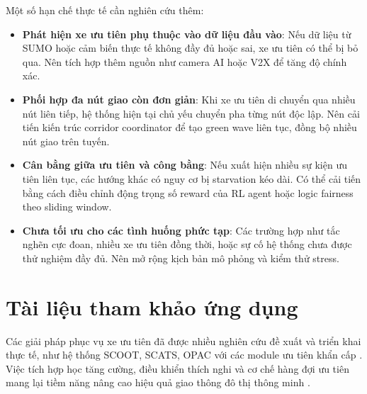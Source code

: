 Một số hạn chế thực tế cần nghiên cứu thêm:
\begin{itemize}
    \item \textbf{Phát hiện xe ưu tiên phụ thuộc vào dữ liệu đầu vào}: Nếu dữ liệu từ SUMO hoặc cảm biến thực tế không đầy đủ hoặc sai, xe ưu tiên có thể bị bỏ qua. Nên tích hợp thêm nguồn như camera AI hoặc V2X để tăng độ chính xác.
    \item \textbf{Phối hợp đa nút giao còn đơn giản}: Khi xe ưu tiên di chuyển qua nhiều nút liên tiếp, hệ thống hiện tại chủ yếu chuyển pha từng nút độc lập. Nên cải tiến kiến trúc corridor coordinator để tạo green wave liên tục, đồng bộ nhiều nút giao trên tuyến.
    \item \textbf{Cân bằng giữa ưu tiên và công bằng}: Nếu xuất hiện nhiều sự kiện ưu tiên liên tục, các hướng khác có nguy cơ bị starvation kéo dài. Có thể cải tiến bằng cách điều chỉnh động trọng số reward của RL agent hoặc logic fairness theo sliding window.
    \item \textbf{Chưa tối ưu cho các tình huống phức tạp}: Các trường hợp như tắc nghẽn cực đoan, nhiều xe ưu tiên đồng thời, hoặc sự cố hệ thống chưa được thử nghiệm đầy đủ. Nên mở rộng kịch bản mô phỏng và kiểm thử stress.
\end{itemize}

\section{Tài liệu tham khảo ứng dụng}

Các giải pháp phục vụ xe ưu tiên đã được nhiều nghiên cứu đề xuất và triển khai thực tế, như hệ thống SCOOT, SCATS, OPAC với các module ưu tiên khẩn cấp \cite{Hunt1981, Lowrie1990, Mirchandani2001}. Việc tích hợp học tăng cường, điều khiển thích nghi và cơ chế hàng đợi ưu tiên mang lại tiềm năng nâng cao hiệu quả giao thông đô thị thông minh \cite{Eom2020, Wei2019, Shaikh2022}.